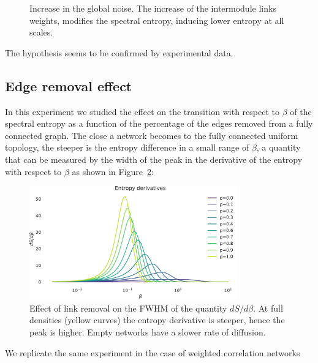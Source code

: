 \documentclass[a4paper]{article}
\begin{document}
\begin{figure}
\caption{Increase in the global noise. The increase of the intermodule links weights, modifies the spectral entropy, inducing lower entropy at all scales.}
\label{fig:benchmark_network}
\end{figure}
The hypothesis seems to be confirmed by experimental data.

\subsection{Edge removal effect}
In this experiment we studied the effect on the transition with respect to $\beta$ of the spectral entropy as a function of the percentage of the edges removed from a fully connected graph.
The close a network becomes to the fully connected uniform topology, the steeper is the entropy difference in a small range of $\beta$, a quantity that can be measured by the width of the peak in the derivative of the entropy with respect to $\beta$ as shown in Figure~\ref{fig:beta_deriv_clique_removal}:
\begin{figure}
\centering
\includegraphics[width=0.8\textwidth]{entropy_derivative_er.pdf}
\caption{Effect of link removal on the FWHM of the quantity $dS/d\beta$. At full densities (yellow curves) the entropy derivative is steeper, hence the peak is higher. Empty networks have a slower rate of diffusion. }
\label{fig:beta_deriv_clique_removal}
\end{figure}

We replicate the same experiment in the case of weighted correlation networks
\end{document}
